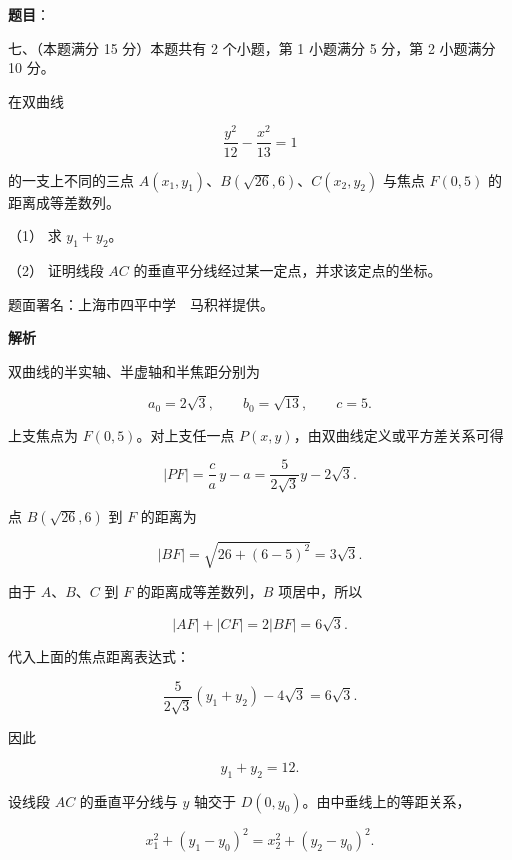 \begin{answer}

\textbf{题目}：

七、（本题满分 15 分）本题共有 2 个小题，第 1 小题满分 5 分，第 2 小题满分 10 分。

在双曲线

\nopagebreak[4]
\[
\frac{y^2}{12}-\frac{x^2}{13}=1
\]

的一支上不同的三点 $A(x_1,y_1)$、$B(\sqrt{26},6)$、$C(x_2,y_2)$ 与焦点 $F(0,5)$ 的距离成等差数列。

（1） 求 $y_1+y_2$。

（2） 证明线段 $AC$ 的垂直平分线经过某一定点，并求该定点的坐标。

\begin{gktip}
题面署名：上海市四平中学　马积祥提供。
\end{gktip}

\textbf{解析}

双曲线的半实轴、半虚轴和半焦距分别为

\nopagebreak[4]
\[
a_0=2\sqrt3,\qquad b_0=\sqrt{13},\qquad c=5.
\]

上支焦点为 $F(0,5)$。对上支任一点 $P(x,y)$，由双曲线定义或平方差关系可得

\nopagebreak[4]
\[
|PF|=\frac ca\,y-a
=\frac{5}{2\sqrt3}y-2\sqrt3.
\]

点 $B(\sqrt{26},6)$ 到 $F$ 的距离为

\nopagebreak[4]
\[
|BF|=\sqrt{26+(6-5)^2}=3\sqrt3.
\]


由于 $A\text{、}B\text{、}C$ 到 $F$ 的距离成等差数列，$B$ 项居中，所以

\nopagebreak[4]
\[
|AF|+|CF|=2|BF|=6\sqrt3.
\]

代入上面的焦点距离表达式：

\nopagebreak[4]
\[
\frac{5}{2\sqrt3}(y_1+y_2)-4\sqrt3=6\sqrt3.
\]

因此

\nopagebreak[4]
\[
y_1+y_2=12.
\]


设线段 $AC$ 的垂直平分线与 $y$ 轴交于 $D(0,y_0)$。由中垂线上的等距关系，

\nopagebreak[4]
\[
x_1^2+(y_1-y_0)^2
=x_2^2+(y_2-y_0)^2.
\]


\end{answer}
